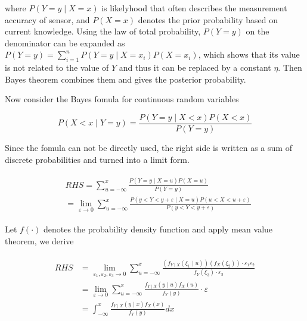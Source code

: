 \documentclass[conference]{IEEEtran}
\begin{document}
	where $P(Y=y\mid X=x)$ is likelyhood that often describes the measurement accuracy of sensor, and $P(X=x)$ denotes the prior probability based on current knowledge. Using the law of total probability, $P(Y=y)$ on the denominator can be expanded as $P(Y=y)=\sum_{i=1}^{n}P(Y=y \mid X=x_{i})P(X=x_{i})$, which shows that its value is not related to the value of $Y$ and thus it can be replaced by a constant $\eta $. Then Bayes theorem combines them and gives the posterior probability.
	
	Now consider the Bayes fomula for continuous random variables
	
	\begin{equation}
	P(X<x\mid Y=y)=\frac{P(Y=y\mid X<x)P(X<x)}{P(Y=y)}
	\label{eq2}
	\end{equation}
	
	Since the fomula can not be directly used, the right side is written as a sum of discrete probabilities and turned into a limit form. 
	
	\begin{equation}
	\begin{split}
	\begin{aligned}
	&RHS=\sum_{u=-\infty}^{x}\frac{P(Y=y\mid X=u)P(X=u)}{P(Y=y)}
	\\
	&=\lim_{\varepsilon \rightarrow 0}\sum_{u=-\infty}^{x}\frac{P(y<Y<y+\varepsilon \mid X=u)P(u<X<u+\varepsilon )}{P(y<Y<y+\varepsilon )}
	\nonumber
	\end{aligned}
	\end{split}
	\end{equation}
	
	Let $f(\cdot )$ denotes the probability density function and apply mean value theorem, we derive
	
	\begin{equation}
	\begin{split}
	\begin{aligned}
	RHS&=\lim_{\varepsilon_{1}, \varepsilon_{2}, \varepsilon_{3} \rightarrow 0}\sum_{u=-\infty}^{x} \frac{(f_{Y\mid X}(\xi _{1}\mid u)) (f_{X}(\xi _{2}))\cdot \varepsilon_{1} \varepsilon_{2}}{f_{Y}
		(\xi _{3})\cdot \varepsilon_{3}}\\
	&=\lim_{\varepsilon \rightarrow 0}\sum_{u=-\infty}^{x}\frac{f_{Y\mid X}(y\mid u)f_{X}(u)}{f_{Y}(y)}\cdot \varepsilon\\ 
	&=\int_{-\infty}^{x}\frac{f_{Y\mid X}(y\mid x)f_{X}(x)}{f_{Y}(y)}dx
	\nonumber
	\end{aligned}
	\end{split}
	\end{equation}
	
\end{document}
